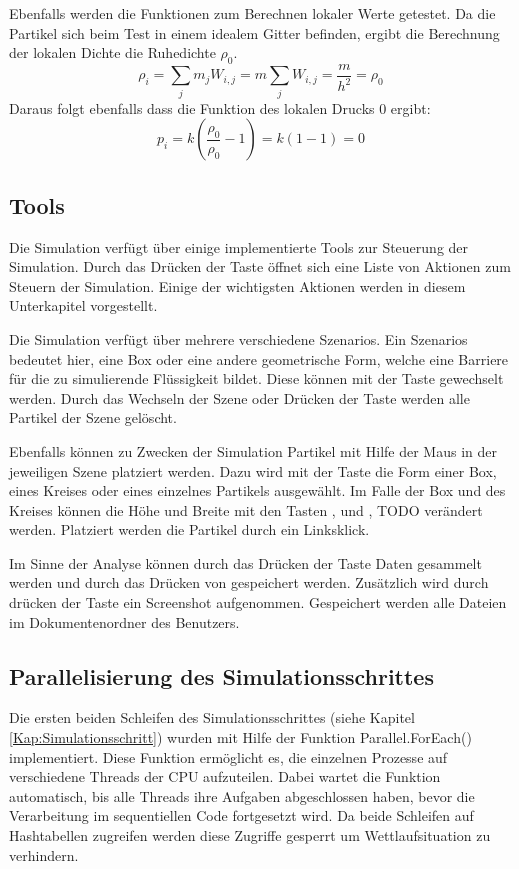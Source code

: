 \documentclass[a4paper, 12pt]{article}
\begin{document}
Ebenfalls werden die Funktionen zum Berechnen lokaler Werte getestet. Da die Partikel sich beim Test in einem idealem Gitter befinden, ergibt die Berechnung der lokalen Dichte die Ruhedichte $\rho_0$.
\[\rho_i = \sum_{j} m_j W_{i, j} = m \sum_{j} W_{i, j} = \frac{m}{h^2} = \rho_0\]
Daraus folgt ebenfalls dass die Funktion des lokalen Drucks 0 ergibt:
\[p_i = k(\frac{\rho_0}{\rho_0} - 1) = k(1 - 1) = 0\]

\subsection{Tools}
Die Simulation verfügt über einige implementierte Tools zur Steuerung der Simulation. Durch das Drücken der Taste  öffnet sich eine Liste von Aktionen zum Steuern der Simulation. Einige der wichtigsten Aktionen werden in diesem Unterkapitel vorgestellt. 

Die Simulation verfügt über mehrere verschiedene \glqq Szenarios\grqq{}. Ein \glqq Szenarios\grqq{} bedeutet hier, eine Box oder eine andere geometrische Form, welche eine Barriere für die zu simulierende Flüssigkeit bildet. Diese können mit der Taste  gewechselt werden. Durch das Wechseln der Szene oder Drücken der Taste  werden alle Partikel der Szene gelöscht. 

Ebenfalls können zu Zwecken der Simulation Partikel mit Hilfe der Maus in der jeweiligen Szene platziert werden. Dazu wird mit der Taste  die Form einer Box, eines Kreises oder eines einzelnes Partikels
ausgewählt. Im Falle der Box und des Kreises können die Höhe und Breite mit den Tasten ,  und ,  TODO verändert werden. Platziert werden die Partikel durch ein Linksklick.

Im Sinne der Analyse können durch das Drücken der Taste  Daten gesammelt werden und durch das Drücken von  gespeichert werden. Zusätzlich wird durch drücken der Taste  ein Screenshot aufgenommen. Gespeichert werden alle Dateien im Dokumentenordner des Benutzers.

\subsection{Parallelisierung des Simulationsschrittes}
Die ersten beiden Schleifen des Simulationsschrittes (siehe Kapitel \ref{Kap:Simulationsschritt}) wurden mit Hilfe der Funktion Parallel.ForEach() implementiert. Diese Funktion ermöglicht es, die einzelnen Prozesse auf verschiedene Threads der CPU aufzuteilen. Dabei wartet die Funktion automatisch, bis alle Threads ihre Aufgaben abgeschlossen haben, bevor die Verarbeitung im sequentiellen Code fortgesetzt wird. Da beide Schleifen auf Hashtabellen zugreifen werden diese Zugriffe gesperrt um Wettlaufsituation zu verhindern.  
\end{document}
